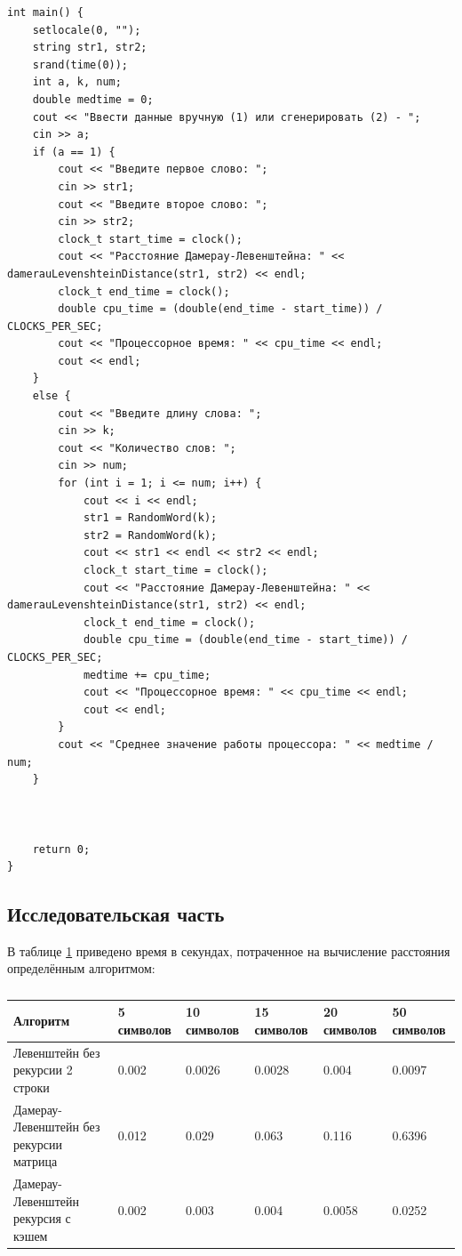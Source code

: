 \documentclass[12pt, a4paper]{article}
\begin{document}
\begin{lstlisting}[caption={Расстояние Дамерау-Левенштейна рекурсивный метод, используя три строки матрицы},label={lst:label3}]
int main() {
	setlocale(0, "");
	string str1, str2;
	srand(time(0));
	int a, k, num;
	double medtime = 0;
	cout << "Ввести данные вручную (1) или сгенерировать (2) - ";
	cin >> a;
	if (a == 1) {
		cout << "Введите первое слово: ";
		cin >> str1;
		cout << "Введите второе слово: ";
		cin >> str2;
		clock_t start_time = clock();
		cout << "Расстояние Дамерау-Левенштейна: " << damerauLevenshteinDistance(str1, str2) << endl;
		clock_t end_time = clock();
		double cpu_time = (double(end_time - start_time)) / CLOCKS_PER_SEC;
		cout << "Процессорное время: " << cpu_time << endl;
		cout << endl;
	}
	else {
		cout << "Введите длину слова: ";
		cin >> k;
		cout << "Количество слов: ";
		cin >> num;
		for (int i = 1; i <= num; i++) {
			cout << i << endl;
			str1 = RandomWord(k);
			str2 = RandomWord(k);
			cout << str1 << endl << str2 << endl;
			clock_t start_time = clock();
			cout << "Расстояние Дамерау-Левенштейна: " << damerauLevenshteinDistance(str1, str2) << endl;
			clock_t end_time = clock();
			double cpu_time = (double(end_time - start_time)) / CLOCKS_PER_SEC;
			medtime += cpu_time;
			cout << "Процессорное время: " << cpu_time << endl;
			cout << endl;
		}
		cout << "Среднее значение работы процессора: " << medtime / num;
	}



	return 0;
}
\end{lstlisting}

\newpage
\begin{center}
    \section{Исследовательская часть}
\end{center}
\justifying

В таблице \ref{tab:my_label} приведено время в секундах, потраченное на вычисление расстояния определённым алгоритмом:
\begin{table}[h]
\begin{center}
    \centering
    \begin{tabular}{ | m{6em} | m{2cm}| m{2cm} | m{2cm} | m{2cm} | m{2cm} |} 
  \hline
 Алгоритм & 5 символов & 10 символов & 15 символов & 20 символов & 50 символов\\ 
  \hline
  Левенштейн без рекурсии 2 строки & 0.002 & 0.0026 & 0.0028 & 0.004 & 0.0097\\ 
  \hline
  Дамерау-Левенштейн без рекурсии матрица & 0.012 & 0.029 & 0.063 & 0.116 & 0.6396\\ 
  \hline
  Дамерау-Левенштейн рекурсия с кэшем & 0.002 & 0.003 & 0.004 & 0.0058 & 0.0252 \\
  \hline
\end{tabular}
\caption{\label{tab:my_label}}
\end{center}
\end{table}
\end{document}
